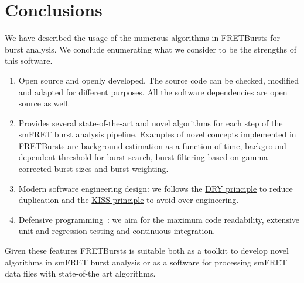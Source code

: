 \section{Conclusions}
\label{sec:conclusions}

We have described the usage of the numerous algorithms in FRETBursts
for burst analysis. We conclude enumerating what we consider to be the strengths
of this software.

\begin{enumerate}
\item Open source and openly developed. The source code can be checked, modified and
adapted for different purposes. All the software dependencies are open source as well.
\item Provides several state-of-the-art and novel algorithms for each step of the 
smFRET burst analysis pipeline. Examples of novel concepts implemented in FRETBursts are background estimation as a function of time,
background-dependent threshold for burst search, burst filtering based on 
gamma-corrected burst sizes and burst weighting.
\item Modern software engineering design: we follows the \href{http://en.wikipedia.org/wiki/Don\%27t_repeat_yourself}{DRY principle} to reduce duplication and the \href{http://en.wikipedia.org/wiki/KISS_principle}{KISS principle} to avoid over-engineering.
\item Defensive programming~\cite{Prli__2012}: we aim for the maximum code readability,
extensive unit and regression testing and continuous integration.
\end{enumerate}

Given these features FRETBursts is suitable both as a toolkit to develop novel algorithms
in smFRET burst analysis or as a software for processing smFRET data files with
state-of-the art algorithms.
